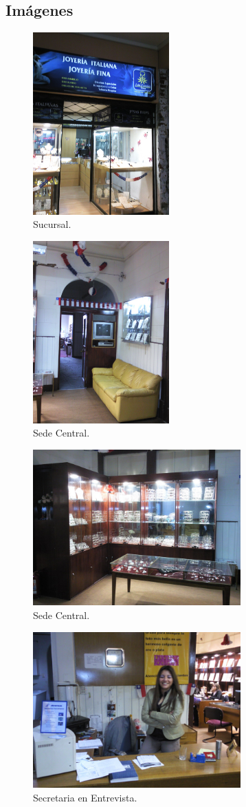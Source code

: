 \subsection{Imágenes}

    \begin{figure}[h!]
    \centering
        \includegraphics[height=7cm]{img/sucursal.jpg}
        \caption{Sucursal.}
    \end{figure} 
    \begin{figure}[h!]
    \centering
        \includegraphics[height=7cm]{img/central1.jpg}
        \caption{Sede Central.}
    \end{figure}
    \begin{figure}[h!]
    \centering
        \includegraphics[height=6cm]{img/central2.jpg}
        \caption{Sede Central.} 
    \end{figure} 
    \begin{figure}[h!]
    \centering
        \includegraphics[height=6cm]{img/secretaria.jpg}
        \caption{Secretaria en Entrevista.}
    \end{figure}
